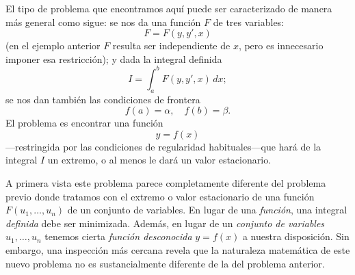\documentclass[12pt,a4paper]{book}
\begin{document}
El tipo de problema que encontramos aquí puede ser caracterizado de manera más general como sigue: se nos da una función $F$ de tres variables:
\begin{equation}
F = F(y, y', x) \tag{27.4}
\end{equation}
(en el ejemplo anterior $F$ resulta ser independiente de $x$, pero es innecesario imponer esa restricción); y dada la integral definida
\begin{equation}
I = \int_a^b F(y, y', x) \, dx; \tag{27.5}
\end{equation}
se nos dan también las condiciones de frontera
\begin{equation}
f(a) = \alpha, \quad f(b) = \beta. \tag{27.6}
\end{equation}
El problema es encontrar una función
\begin{equation}
y = f(x) \tag{27.7}
\end{equation}
---restringida por las condiciones de regularidad habituales---que hará de la integral $I$ un extremo, o al menos le dará un valor estacionario.

A primera vista este problema parece completamente diferente del problema previo donde tratamos con el extremo o valor estacionario de una función $F(u_1, \ldots, u_n)$ de un conjunto de variables. En lugar de una \textit{función}, una integral \textit{definida} debe ser minimizada. Además, en lugar de un \textit{conjunto de variables} $u_1, \ldots, u_n$ tenemos cierta \textit{función desconocida} $y = f(x)$ a nuestra disposición. Sin embargo, una inspección más cercana revela que la naturaleza matemática de este nuevo problema no es sustancialmente diferente de la del problema anterior.
\end{document}
